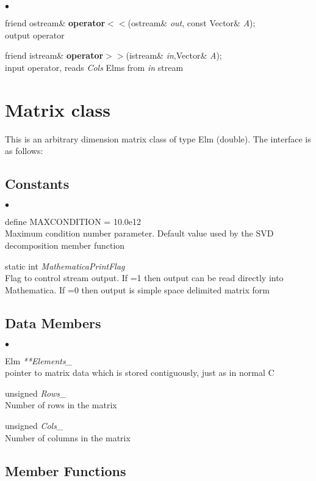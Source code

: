 \documentclass{article}
\newcommand{\Func}[1]{\textbf{#1}}
\newcommand{\var}[1]{\textit{#1}}
\newcommand{\defn}[1]{\textrm{#1}}
\newenvironment{LIST}{\begin{list}{$\bullet$}{%
      \setlength{\leftmargin}{2\leftmargin}%
      \setlength{\itemindent}{-1cm}}}%
  {\end{list}}
\begin{document}
\begin{LIST}
 \item friend ostream\& \Func{operator$<<$}(ostream\& \var{out},
  const Vector\& \var{A});\\
  output operator
 \item friend istream\& \Func{operator$>>$}(istream\& \var{in},Vector\& \var{A});\\
  input operator, reads \var{Cols} Elms from \var{in} stream
\end{LIST}

\section{Matrix class}

This is an arbitrary dimension matrix class of type Elm (double).  The
interface is as follows:

\subsection{Constants}

\begin{LIST}
 \item define \defn{MAXCONDITION} = 10.0e12\\
  Maximum condition number parameter.  Default value used by the SVD
  decomposition member function
 \item static int \var{MathematicaPrintFlag}\\
  Flag to control stream output.  If =1 then output can be read directly into
  Mathematica. If =0 then output is simple space delimited matrix form
\end{LIST}

\subsection{Data Members}

\begin{LIST}
 \item Elm \var{**Elements\_}\\
  pointer to matrix data which is stored contiguously, just as in normal C
 \item unsigned \var{Rows\_}\\
  Number of rows in the matrix
 \item unsigned \var{Cols\_}\\
  Number of columns in the matrix
\end{LIST}

\subsection{Member Functions}
\end{document}
